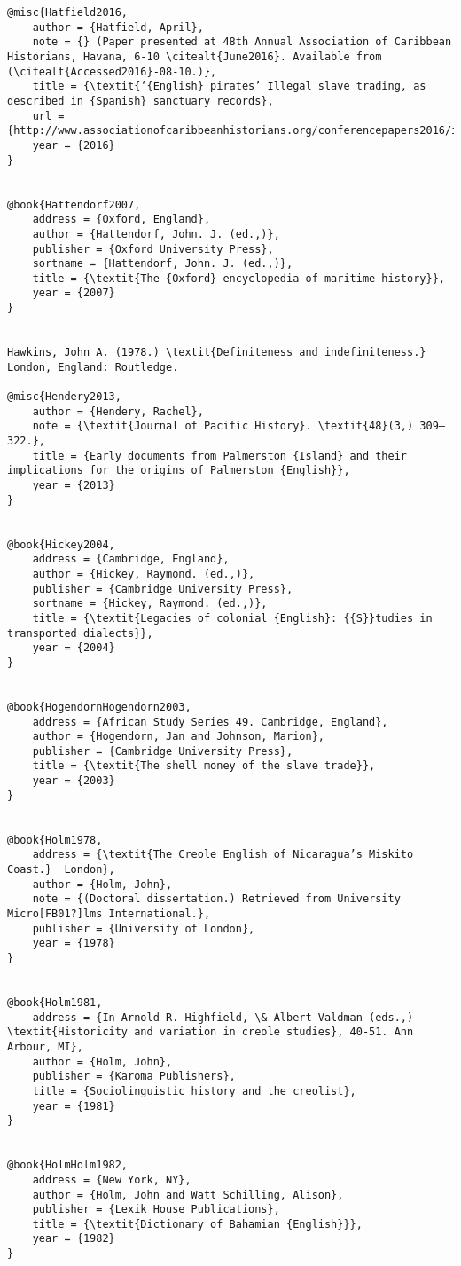 \begin{verbatim}
@misc{Hatfield2016,
	author = {Hatfield, April},
	note = {} (Paper presented at 48th Annual Association of Caribbean Historians, Havana, 6-10 \citealt{June2016}. Available from  (\citealt{Accessed2016}-08-10.)},
	title = {\textit{‘{English} pirates’ Illegal slave trading, as described in {Spanish} sanctuary records},
	url = {http://www.associationofcaribbeanhistorians.org/conferencepapers2016/index.htm)},
	year = {2016}
}


@book{Hattendorf2007,
	address = {Oxford, England},
	author = {Hattendorf, John. J. (ed.,)},
	publisher = {Oxford University Press},
	sortname = {Hattendorf, John. J. (ed.,)},
	title = {\textit{The {Oxford} encyclopedia of maritime history}},
	year = {2007}
}


Hawkins, John A. (1978.) \textit{Definiteness and indefiniteness.} London, England: Routledge.

@misc{Hendery2013,
	author = {Hendery, Rachel},
	note = {\textit{Journal of Pacific History}. \textit{48}(3,) 309–322.},
	title = {Early documents from Palmerston {Island} and their implications for the origins of Palmerston {English}},
	year = {2013}
}


@book{Hickey2004,
	address = {Cambridge, England},
	author = {Hickey, Raymond. (ed.,)},
	publisher = {Cambridge University Press},
	sortname = {Hickey, Raymond. (ed.,)},
	title = {\textit{Legacies of colonial {English}: {{S}}tudies in transported dialects}},
	year = {2004}
}


@book{HogendornHogendorn2003,
	address = {African Study Series 49. Cambridge, England},
	author = {Hogendorn, Jan and Johnson, Marion},
	publisher = {Cambridge University Press},
	title = {\textit{The shell money of the slave trade}},
	year = {2003}
}


@book{Holm1978,
	address = {\textit{The Creole English of Nicaragua’s Miskito Coast.}  London},
	author = {Holm, John},
	note = {(Doctoral dissertation.) Retrieved from University Micro[FB01?]lms International.},
	publisher = {University of London},
	year = {1978}
}


@book{Holm1981,
	address = {In Arnold R. Highfield, \& Albert Valdman (eds.,) \textit{Historicity and variation in creole studies}, 40-51. Ann Arbour, MI},
	author = {Holm, John},
	publisher = {Karoma Publishers},
	title = {Sociolinguistic history and the creolist},
	year = {1981}
}


@book{HolmHolm1982,
	address = {New York, NY},
	author = {Holm, John and Watt Schilling, Alison},
	publisher = {Lexik House Publications},
	title = {\textit{Dictionary of Bahamian {English}}},
	year = {1982}
}



\end{verbatim}
